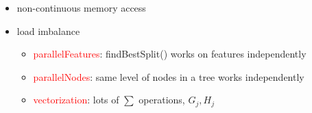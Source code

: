 \documentclass{beamer}
\begin{document}
\begin{frame}
\begin{columns}[c]
		\begin{itemize}
			\item non-continuous memory access
			\item load imbalance 
			\begin{itemize}			
				\item \textcolor{red}{parallelFeatures}: findBestSplit() works on features independently
				\item \textcolor{red}{parallelNodes}: same level of nodes in a tree works independently
				\item \textcolor{red}{vectorization}: lots of $\sum$ operations, $G_j, H_j$
			\end{itemize}			
		\end{itemize}
	\end{columns}	
\end{frame}
\end{document}
